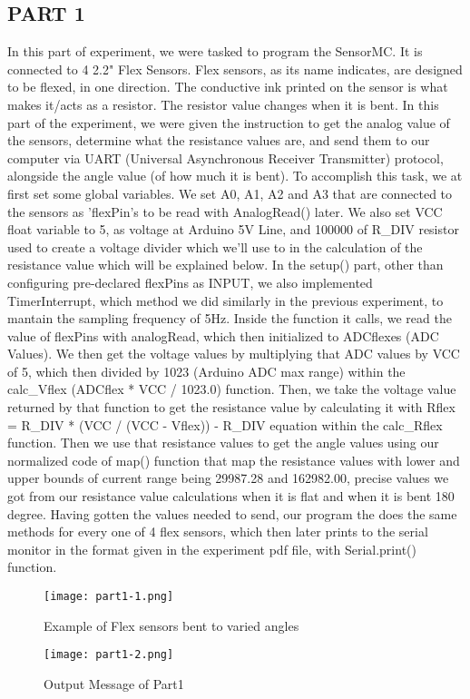 \documentclass[pdftex,12pt,a4paper]{article}
\begin{document}
\subsection{PART 1}
In this part of experiment, we were tasked to program the SensorMC. It is connected to 4 2.2" Flex Sensors. Flex sensors, as its name indicates, are designed to be flexed, in one direction. The conductive ink printed on the sensor is what makes it/acts as a resistor. The resistor value changes when it is bent. In this part of the experiment, we were given the instruction to get the analog value of the sensors, determine what the resistance values are, and send them to our computer via UART (Universal Asynchronous Receiver Transmitter) protocol, alongside the angle value (of how much it is bent). To accomplish this task, we at first set some global variables. We set A0, A1, A2 and A3 that are connected to the sensors as 'flexPin's to be read with AnalogRead() later. We also set VCC float variable to 5, as voltage at Arduino 5V Line, and 100000 of R\_DIV resistor used to create a voltage divider which we'll use to in the calculation of the resistance value which will be explained below. In the setup() part, other than configuring pre-declared flexPins as INPUT, we also implemented TimerInterrupt, which method we did similarly in the previous experiment, to mantain the sampling frequency of 5Hz. Inside the function it calls, we read the value of flexPins with analogRead, which then initialized to ADCflexes (ADC Values). We then get the voltage values by multiplying that ADC values by VCC of 5, which then divided by 1023 (Arduino ADC max range)  within the calc\_Vflex (ADCflex * VCC / 1023.0) function. Then, we take the voltage value returned by that function to get the resistance value by calculating it with Rflex = R\_DIV * (VCC / (VCC - Vflex)) - R\_DIV equation within the calc\_Rflex function. Then we use that resistance values to get the angle values using our normalized code of map() function that map the resistance values with lower and upper bounds of current range being 29987.28 and 162982.00, precise values we got from our resistance value calculations when it is flat and when it is bent 180 degree. Having gotten the values needed to send, our program the does the same methods for every one of 4 flex sensors, which then later prints to the serial monitor in the format given in the experiment pdf file, with Serial.print() function. 

\begin{figure}[H]
	\centering
	\texttt{[image: part1-1.png]}	
	\caption{Example of Flex sensors bent to varied angles}
	\label{fig5}
\end{figure}
\begin{figure}[H]
	\centering
	\texttt{[image: part1-2.png]}	
	\caption{Output Message of Part1}
	\label{fig5}
\end{figure}
\end{document}
